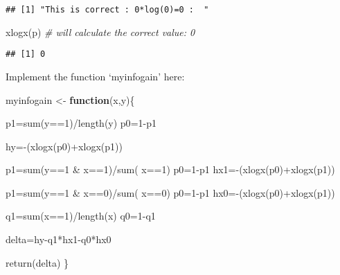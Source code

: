 \documentclass[
]{article}
\newenvironment{Shaded}{\begin{snugshade}}{\end{snugshade}}
\newcommand{\CommentTok}[1]{\textcolor[rgb]{0.56,0.35,0.01}{\textit{#1}}}
\newcommand{\ControlFlowTok}[1]{\textcolor[rgb]{0.13,0.29,0.53}{\textbf{#1}}}
\newcommand{\DecValTok}[1]{\textcolor[rgb]{0.00,0.00,0.81}{#1}}
\newcommand{\FunctionTok}[1]{\textcolor[rgb]{0.00,0.00,0.00}{#1}}
\newcommand{\NormalTok}[1]{#1}
\newcommand{\OtherTok}[1]{\textcolor[rgb]{0.56,0.35,0.01}{#1}}
\newcommand{\SpecialCharTok}[1]{\textcolor[rgb]{0.00,0.00,0.00}{#1}}
\begin{document}
\begin{verbatim}
## [1] "This is correct : 0*log(0)=0 :  "
\end{verbatim}

\begin{Shaded}
\begin{Highlighting}[]
\FunctionTok{xlogx}\NormalTok{(p)   }\CommentTok{\# will calculate the correct value: 0}
\end{Highlighting}
\end{Shaded}

\begin{verbatim}
## [1] 0
\end{verbatim}

Implement the function `myinfogain' here:

\begin{Shaded}
\begin{Highlighting}[]
\NormalTok{myinfogain }\OtherTok{\textless{}{-}} \ControlFlowTok{function}\NormalTok{(x,y)\{}

\NormalTok{  p1}\OtherTok{=}\FunctionTok{sum}\NormalTok{(y}\SpecialCharTok{==}\DecValTok{1}\NormalTok{)}\SpecialCharTok{/}\FunctionTok{length}\NormalTok{(y)}
\NormalTok{  p0}\OtherTok{=}\DecValTok{1}\SpecialCharTok{{-}}\NormalTok{p1}
  
\NormalTok{  hy}\OtherTok{=}\SpecialCharTok{{-}}\NormalTok{(}\FunctionTok{xlogx}\NormalTok{(p0)}\SpecialCharTok{+}\FunctionTok{xlogx}\NormalTok{(p1))}
  
\NormalTok{  p1}\OtherTok{=}\FunctionTok{sum}\NormalTok{(y}\SpecialCharTok{==}\DecValTok{1} \SpecialCharTok{\&}\NormalTok{ x}\SpecialCharTok{==}\DecValTok{1}\NormalTok{)}\SpecialCharTok{/}\FunctionTok{sum}\NormalTok{( x}\SpecialCharTok{==}\DecValTok{1}\NormalTok{)}
\NormalTok{  p0}\OtherTok{=}\DecValTok{1}\SpecialCharTok{{-}}\NormalTok{p1}
\NormalTok{  hx1}\OtherTok{=}\SpecialCharTok{{-}}\NormalTok{(}\FunctionTok{xlogx}\NormalTok{(p0)}\SpecialCharTok{+}\FunctionTok{xlogx}\NormalTok{(p1))}
  
\NormalTok{  p1}\OtherTok{=}\FunctionTok{sum}\NormalTok{(y}\SpecialCharTok{==}\DecValTok{1} \SpecialCharTok{\&}\NormalTok{ x}\SpecialCharTok{==}\DecValTok{0}\NormalTok{)}\SpecialCharTok{/}\FunctionTok{sum}\NormalTok{( x}\SpecialCharTok{==}\DecValTok{0}\NormalTok{)}
\NormalTok{  p0}\OtherTok{=}\DecValTok{1}\SpecialCharTok{{-}}\NormalTok{p1}
\NormalTok{  hx0}\OtherTok{=}\SpecialCharTok{{-}}\NormalTok{(}\FunctionTok{xlogx}\NormalTok{(p0)}\SpecialCharTok{+}\FunctionTok{xlogx}\NormalTok{(p1))}
  
\NormalTok{  q1}\OtherTok{=}\FunctionTok{sum}\NormalTok{(x}\SpecialCharTok{==}\DecValTok{1}\NormalTok{)}\SpecialCharTok{/}\FunctionTok{length}\NormalTok{(x)}
\NormalTok{  q0}\OtherTok{=}\DecValTok{1}\SpecialCharTok{{-}}\NormalTok{q1}
  
  
\NormalTok{  delta}\OtherTok{=}\NormalTok{hy}\SpecialCharTok{{-}}\NormalTok{q1}\SpecialCharTok{*}\NormalTok{hx1}\SpecialCharTok{{-}}\NormalTok{q0}\SpecialCharTok{*}\NormalTok{hx0}
  
  
  \FunctionTok{return}\NormalTok{(delta)}
\NormalTok{\}}
\end{Highlighting}
\end{Shaded}
\end{document}
